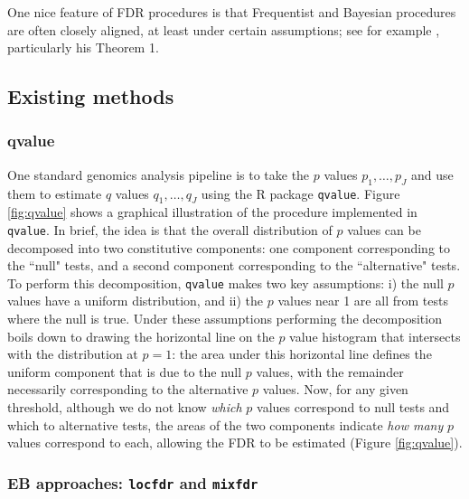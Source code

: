 \documentclass[11pt]{article}
\def\qvalue{{\tt qvalue}\xspace}
\def\locfdr{{\tt locfdr}\xspace}
\def\mixfdr{{\tt mixfdr}\xspace}
\begin{document}
One nice feature of FDR procedures is that Frequentist and Bayesian procedures are often closely aligned, at least under certain assumptions; see
for example \cite{storey.03}, particularly his Theorem 1. 

\subsection{Existing methods}

\subsubsection{qvalue}

One standard genomics analysis pipeline is to take the $p$ values $p_1,\dots,p_J$ and use them to estimate $q$ values $q_1,\dots,q_J$
 using the R package \qvalue.
  Figure \ref{fig:qvalue} shows a graphical illustration of the procedure implemented in \qvalue. 
 In brief, the idea is that the overall distribution of $p$ values can be decomposed into two constitutive
 components: one component corresponding to the ``null" tests, and a second component corresponding to the ``alternative" tests. 
To perform this decomposition, \qvalue makes two key assumptions:
  i) the null $p$ values have a uniform distribution, and ii) the $p$ values near 1 are all from
 tests where the null is true. Under these assumptions performing the decomposition boils down to 
 drawing the horizontal line on the $p$ value histogram that intersects with the distribution at $p=1$: the area under this horizontal
 line defines the uniform component that is due to the null $p$ values, with the remainder necessarily corresponding to
 the alternative $p$ values. Now, for any given threshold, although we do not know {\it which} $p$ values correspond
 to  null tests  and which to alternative tests, the areas of the two components indicate {\it how many} $p$ values correspond to each,
 allowing the FDR to be estimated (Figure \ref{fig:qvalue}). 
 
\subsubsection{EB approaches: \locfdr and \mixfdr}
 
\end{document}
